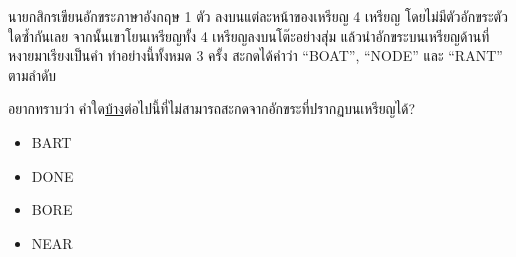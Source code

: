\question{}

นายกสิกรเขียนอักขระภาษาอังกฤษ 1 ตัว ลงบนแต่ละหน้าของเหรียญ 4 เหรียญ โดยไม่มีตัวอักขระตัวใดซ้ำกันเลย
จากนั้นเขาโยนเหรียญทั้ง 4 เหรียญลงบนโต๊ะอย่างสุ่ม แล้วนำอักขระบนเหรียญด้านที่หงายมาเรียงเป็นคำ
ทำอย่างนี้ทั้งหมด 3 ครั้ง สะกดได้คำว่า ``BOAT'', ``NODE'' และ ``RANT'' ตามลำดับ

อยากทราบว่า คำใด\uline{บ้าง}ต่อไปนี้ที่ไม่สามารถสะกดจากอักขระที่ปรากฏบนเหรียญได้?
\begin{multicols}{4}
\begin{itemize}[label={$\square$}]
\item BART
\item DONE
\item BORE
\item NEAR
\end{itemize}
\end{multicols}
